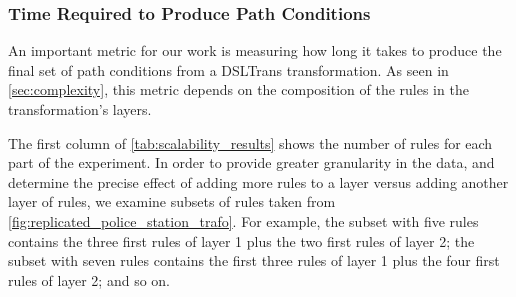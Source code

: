 \subsubsection{Time Required to Produce Path Conditions}

An important metric for our work is measuring how long it takes to produce the final set of path conditions from a DSLTrans transformation. As seen in \cref{sec:complexity}, this metric depends on the composition of the rules in the transformation's layers.

The first column of \cref{tab:scalability_results} shows the number of
rules for each part of the experiment. In order to provide greater granularity in the data, and determine the precise effect of adding more rules to a layer versus adding another layer of rules, we examine subsets of rules taken from \cref{fig:replicated_police_station_trafo}. For example, the subset with five rules contains the three first rules of layer 1 plus the two first rules of layer 2; the subset with seven rules contains the first three rules of layer 1 plus the four first rules of layer 2; and so on.

